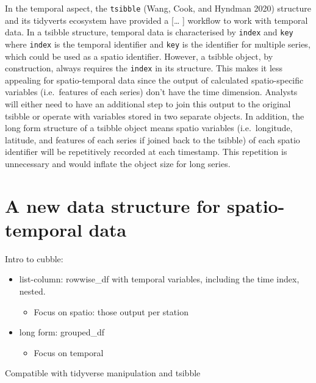 \documentclass{article}
\begin{document}
In the temporal aspect, the \texttt{tsibble} (Wang, Cook, and Hyndman
2020) structure and its tidyverts ecosystem have provided a {[}\ldots{}
{]} workflow to work with temporal data. In a tsibble structure,
temporal data is characterised by \texttt{index} and \texttt{key} where
\texttt{index} is the temporal identifier and \texttt{key} is the
identifier for multiple series, which could be used as a spatio
identifier. However, a tsibble object, by construction, always requires
the \texttt{index} in its structure. This makes it less appealing for
spatio-temporal data since the output of calculated spatio-specific
variables (i.e.~features of each series) don't have the time dimension.
Analysts will either need to have an additional step to join this output
to the original tsibble or operate with variables stored in two separate
objects. In addition, the long form structure of a tsibble object means
spatio variables (i.e.~longitude, latitude, and features of each series
if joined back to the tsibble) of each spatio identifier will be
repetitively recorded at each timestamp. This repetition is unnecessary
and would inflate the object size for long series.

\hypertarget{a-new-data-structure-for-spatio-temporal-data}{%
\section{A new data structure for spatio-temporal
data}\label{a-new-data-structure-for-spatio-temporal-data}}

Intro to cubble:

\begin{itemize}
\tightlist
\item
  list-column: rowwise\_df with temporal variables, including the time
  index, nested.

  \begin{itemize}
  \tightlist
  \item
    Focus on spatio: those output per station
  \end{itemize}
\item
  long form: grouped\_df

  \begin{itemize}
  \tightlist
  \item
    Focus on temporal
  \end{itemize}
\end{itemize}

Compatible with tidyverse manipulation and tsibble
\end{document}
